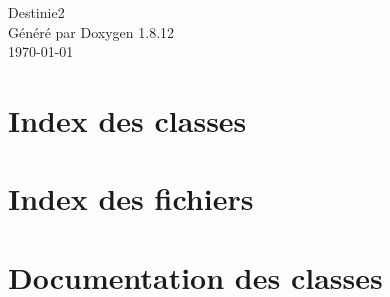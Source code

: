 \documentclass[twoside]{article}
\newcommand{\+}{\discretionary{\mbox{\scriptsize$\hookleftarrow$}}{}{}}
\begin{document}
\hypersetup{pageanchor=false,
             bookmarksnumbered=true,
             pdfencoding=unicode
            }
\begin{titlepage}
\vspace*{7cm}
\begin{center}%
{\Large Destinie2 }\\
\vspace*{1cm}
{\large Généré par Doxygen 1.8.12}\\
\vspace*{0.5cm}
{\small \today }\\
\end{center}
\end{titlepage}
\tableofcontents
{}
\hypersetup{pageanchor=true}



\section{Index des classes}

\section{Index des fichiers}

\section{Documentation des classes}


%





















%
%


















\end{document}
